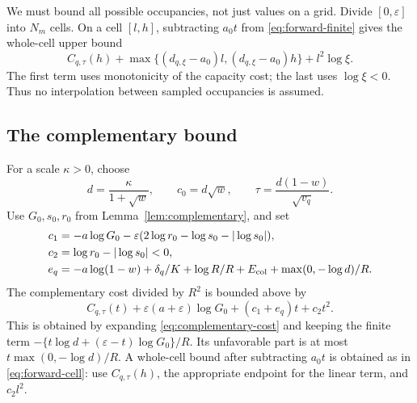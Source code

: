 We must bound all possible occupancies, not just values on a grid. Divide $[0,\varepsilon]$ into $N_m$ cells. On a cell $[l,h]$, subtracting $a_0t$ from \eqref{eq:forward-finite} gives the whole-cell upper bound
\begin{equation}\label{eq:forward-cell}
 C_{q,\tau}(h)+
 \max\{(d_{q,\xi}-a_0)l,(d_{q,\xi}-a_0)h\}
 +l^2\log\xi.
\end{equation}
The first term uses monotonicity of the capacity cost; the last uses $\log\xi<0$. Thus no interpolation between sampled occupancies is assumed.

\subsection{The complementary bound}
For a scale $\kappa>0$, choose
\[
 d=\frac{\kappa}{1+\sqrt w},\qquad c_0=d\sqrt w,
 \qquad \tau=\frac{d(1-w)}{\sqrt{v_q}}.
\]
Use $G_0,s_0,r_0$ from Lemma~\ref{lem:complementary}, and set
\begin{align*}
 c_1&=-a\log G_0-\varepsilon
       (2\log r_0-\log s_0-|\log s_0|),\\
 c_2&=\log r_0-|\log s_0|<0,\\
 e_q&=-a\log(1-w)+\delta_q/K+\log R/R+E_{\rm col}
                       +\max(0,-\log d)/R.
\end{align*}
The complementary cost divided by $R^2$ is bounded above by
\begin{equation}\label{eq:complement-finite}
 C_{q,\tau}(t)+\varepsilon(a+\varepsilon)\log G_0
                   +(c_1+e_q)t+c_2t^2.
\end{equation}
This is obtained by expanding \eqref{eq:complementary-cost} and keeping the finite term $-\{t\log d+(\varepsilon-t)\log G_0\}/R$. Its unfavorable part is at most $t\max(0,-\log d)/R$. A whole-cell bound after subtracting $a_0t$ is obtained as in \eqref{eq:forward-cell}: use $C_{q,\tau}(h)$, the appropriate endpoint for the linear term, and $c_2l^2$.

